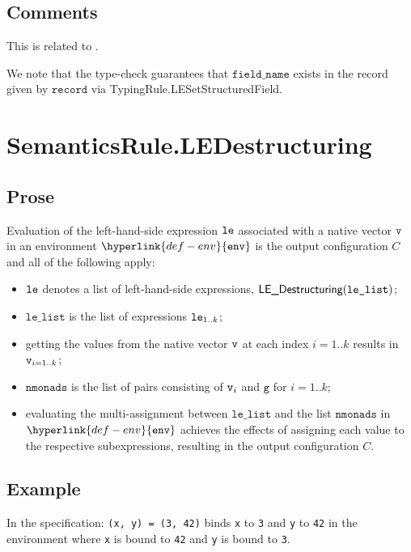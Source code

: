 \documentclass{book}
\newcommand\env[0]{\hyperlink{def-env}{\texttt{env}}}
\newcommand\vg[0]{\texttt{g}}
\newcommand\fieldname[0]{\texttt{field\_name}}
\newcommand\record[0]{\texttt{record}}
\newcommand\vlelist[0]{\texttt{le\_list}}
\newcommand\nmonads[0]{\texttt{nmonads}}
\begin{document}
\subsection{Comments}
  This is related to .

  We note that the type-check guarantees that $\fieldname$ exists in the record given by $\record$
  via TypingRule.LESetStructuredField.

\section{SemanticsRule.LEDestructuring \label{sec:SemanticsRule.LEDestructuring}}
    \subsection{Prose}
    Evaluation of the left-hand-side expression $\texttt{le}$ associated with a
    native vector $\texttt{v}$ in an environment $\env$ is the output configuration $C$
    and all of the following apply:
    \begin{itemize}
    \item $\texttt{le}$ denotes a list of left-hand-side expressions, $\LEDestructuring(\vlelist)$;
    \item $\vlelist$ is the list of expressions $\texttt{le}_{1..k}$;
    \item getting the values from the native vector $\texttt{v}$ at each index $i=1..k$
    results in $\texttt{v}_{i=1..k}$;
    \item $\nmonads$ is the list of pairs consisting of $\texttt{v}_i$ and $\vg$ for $i=1..k$;
    \item evaluating the multi-assignment between $\vlelist$ and the list $\nmonads$
    in $\env$ achieves the effects of assigning each value to the respective
    subexpressions, resulting in the output configuration $C$.
    \end{itemize}

    \subsection{Example}
    In the specification:
    \texttt{(x, y) = (3, 42)} binds \texttt{x} to \texttt{3} and \texttt{y} to \texttt{42} in the environment where \texttt{x} is bound to \texttt{42} and \texttt{y} is bound to \texttt{3}.

\end{document}

